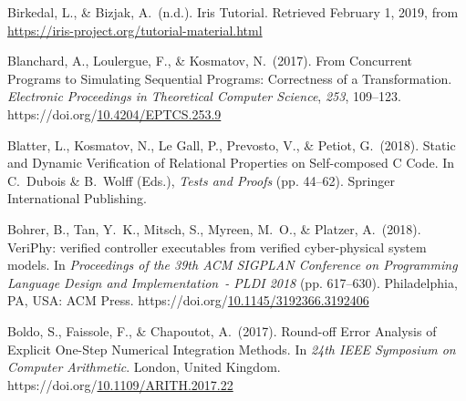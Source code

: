 \documentclass[12pt,twoside]{article}
\begin{document}
{\begin{thebibliography}{222}
\mdbibitemlabel{}Birkedal, L., \& Bizjak, A.~(n.d.). Iris Tutorial. Retrieved February 1, 2019, from \href{https://iris-project.org/tutorial-material.html}{{\ttfamily https://\hspace{0pt}iris-\hspace{0pt}project.\hspace{0pt}org/\hspace{0pt}tutorial-\hspace{0pt}material.\hspace{0pt}html}}\label{birkedal_iris_nodate}%

\mdbibitemlabel{}Blanchard, A., Loulergue, F., \& Kosmatov, N.~(2017). From Concurrent Programs to Simulating Sequential Programs: Correctness of a Transformation. \emph{Electronic Proceedings in Theoretical Computer Science}, \emph{253}, 109–123. https://doi.org/\href{https://dx.doi.org/10.4204/EPTCS.253.9}{10.4204/EPTCS.253.9}\label{blanchard_concurrent_2017}%

\mdbibitemlabel{}Blatter, L., Kosmatov, N., Le Gall, P., Prevosto, V., \& Petiot, G.~(2018). Static and Dynamic Verification of Relational Properties on Self-composed C Code. In C.~Dubois \& B.~Wolff (Eds.), \emph{Tests and Proofs} (pp. 44–62). Springer International Publishing.\label{blatter_static_2018}%

\mdbibitemlabel{}Bohrer, B., Tan, Y.~K., Mitsch, S., Myreen, M.~O., \& Platzer, A.~(2018). VeriPhy: verified controller executables from verified cyber-physical system models. In \emph{Proceedings of the 39th ACM SIGPLAN Conference on Programming Language Design and Implementation~- PLDI 2018} (pp. 617–630). Philadelphia, PA, USA: ACM Press. https://doi.org/\href{https://dx.doi.org/10.1145/3192366.3192406}{10.1145/3192366.3192406}\label{bohrer_veriphy:_2018}%

\mdbibitemlabel{}Boldo, S., Faissole, F., \& Chapoutot, A.~(2017). Round-off Error Analysis of Explicit One-Step Numerical Integration Methods. In \emph{24th IEEE Symposium on Computer Arithmetic}. London, United Kingdom. https://doi.org/\href{https://dx.doi.org/10.1109/ARITH.2017.22}{10.1109/ARITH.2017.22}\label{boldo_round-off_2017}%


\end{thebibliography}}
\end{document}
